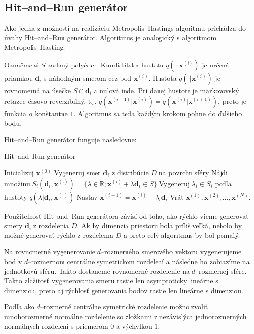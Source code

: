 \subsection{Hit--and--Run generátor}

Ako jedna z možností na realizáciu Metropolis--Hastings algoritmu prichádza do úvahy Hit--and--Run generátor. Algoritmus je analogický s algoritmom Metropolis--Hasting.

Označme si $S$ zadaný polyéder. Kandidátska hustota $q(\cdot|\mathbf x^{(i)})$ je určená priamkou $\mathbf d_i$ s náhodným smerom cez bod $\mathbf x^{(i)}$. Hustota $q(\cdot|\mathbf x^{(i)})$ je rovnomerná na úsečke $S \cap \mathbf d_i$ a nulová inde. Pri danej hustote je markovovský reťazec časovo reverzibilný, t.j. $q(\mathbf x^{(i+1)}|\mathbf x^{(i)})=q(\mathbf x^{(i)}|\mathbf x^{(i+1)}),$ \cite{hit-and-run_chen} preto je funkcia $\alpha$ konštantne $1$. Algoritmus sa teda každým krokom pohne do ďalšieho bodu.

Hit--and--Run generátor funguje nasledovne:

\begin{algorithm}[H]
	\caption{Hit--and--Run generátor \cite{hit-and-run_chen}}
	\label{hit--and--run}
	\begin{algorithmic}[1]
		\State Inicializuj $\mathbf x^{(0)}$
			\State Vygeneruj smer $\mathbf d_i$ z distribúcie $D$ na povrchu sféry
			\State Nájdi množinu $S_i(\mathbf d_i,\mathbf x^{(i)})=\{\lambda \in \mathbb{R}; \mathbf x^{(i)} + \lambda \mathbf d_i \in S \} $
			\State Vygeneruj $\lambda_i \in S_i$ podľa hustoty $q(\lambda | \mathbf d_i, \mathbf x^{(i)})$
			\State Nastav $\mathbf x^{(i+1)}=\mathbf x^{(i)}+\lambda_i \mathbf d_i$
		\EndFor
		\State Vráť $\mathbf x^{(1)},\mathbf x^{(2)},\dots,\mathbf x^{(N)}$.
	\end{algorithmic}
\end{algorithm}

Použiteľnosť Hit--and--Run generátora závisí od toho, ako rýchlo vieme generovať smery $\mathbf d_i$ z rozdelenia $D$. Ak by dimenzia priestoru bola príliš veľká, nebolo by možné generovať rýchlo z rozdelenia $D$ a preto celý algoritmus by bol pomalý. 

Na rovnomerné vygenerovanie $d$--rozmerného smerového vektoru vygenerujeme bod v $d$--rozmernom centrálne symetrickom rozdelení a následne ho zobrazíme na jednotkovú sféru. Takto dostaneme rovnomerné rozdelenie na $d$--rozmernej sfére. Takto zložitosť vygenerovania smeru rastie len asymptoticky lineárne s dimenziou, preto aj rýchlosť generovania bodov rastie len lineárne s dimenziou.

Podľa \cite{decompositional_harman} ako $d$--rozmerné centrálne symetrické rozdelenie možno zvoliť mnohorozmerné normálne rozdelenie so zložkami z nezávislých jednorozmerných normálnych rozdelení s priemerom $0$ a výchylkou $1$.
